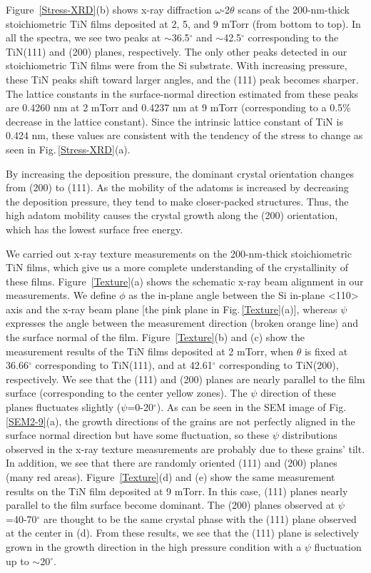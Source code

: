 \documentclass{report}
\begin{document}
Figure \,\ref{Stress-XRD}(b) shows x-ray diffraction $\omega$-2$\theta$ scans of the 200-nm-thick stoichiometric TiN films deposited at 2, 5, and 9 mTorr (from bottom to top). In all the spectra, we see two peaks at $\sim$36.5$^{\circ}$ and $\sim$42.5$^{\circ}$ corresponding to the TiN(111) and (200) planes, respectively. The only other peaks detected in our stoichiometric TiN films were from the Si substrate.  With increasing pressure, these TiN peaks shift toward larger angles, and the (111) peak becomes sharper. The lattice constants in the surface-normal direction estimated from these peaks are 0.4260 nm at 2 mTorr and 0.4237 nm at 9 mTorr (corresponding to a 0.5\% decrease in the lattice constant). Since the intrinsic lattice constant of TiN is 0.424 nm, these values are consistent with the tendency of the stress to change as seen in Fig.\,\ref{Stress-XRD}(a).

By increasing the deposition pressure, the dominant crystal orientation changes from (200) to (111). As the mobility of the adatoms is increased by decreasing the deposition pressure, they tend to make closer-packed structures. Thus, the high adatom mobility causes the crystal growth along the (200) orientation, which has the lowest surface free energy.\cite{Patsalas2000}

We carried out x-ray texture measurements on the 200-nm-thick stoichiometric TiN films, which give us a more complete understanding of the crystallinity of these films. Figure \,\ref{Texture}(a) shows the schematic x-ray beam alignment in our measurements. We define $\phi$ as the in-plane angle between the Si in-plane <110> axis and the x-ray beam plane [the pink plane in Fig.\,\ref{Texture}(a)], whereas $\psi$ expresses the angle between the measurement direction (broken orange line) and the surface normal of the film. Figure \,\ref{Texture}(b) and (c) show the measurement results of the TiN films deposited at 2 mTorr, when $\theta$ is fixed at 36.66$^{\circ}$ corresponding to TiN(111), and at 42.61$^{\circ}$ corresponding to TiN(200), respectively. We see that the (111) and (200) planes are nearly parallel to the film surface (corresponding to the center yellow zones). The $\psi$ direction of these planes fluctuates slightly ($\psi$=0-20$^{\circ}$). As can be seen in the SEM image of Fig.\,\ref{SEM2-9}(a), the growth directions of the grains are not perfectly aligned in the surface normal direction but have some fluctuation, so these $\psi$ distributions observed in the x-ray texture measurements are probably due to these grains' tilt. In addition, we see that there are randomly oriented (111) and (200) planes (many red areas). Figure \,\ref{Texture}(d) and (e) show the same measurement results on the TiN film deposited at 9 mTorr. In this case, (111) planes nearly parallel to the film surface become dominant. The (200) planes observed at $\psi$=40-70$^{\circ}$ are thought to be the same crystal phase with the (111) plane observed at the center in (d). From these results, we see that the (111) plane is selectively grown in the growth direction in the high pressure condition with a $\psi$ fluctuation up to $\sim$20$^{\circ}$.
\end{document}
